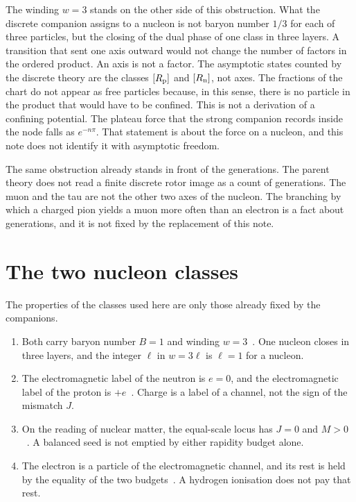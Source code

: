 \documentclass[a4paper]{article}
\begin{document}
The winding \(w=3\) stands on the other side of this obstruction. What the discrete companion assigns to a nucleon is not baryon number \(1/3\) for each of three particles, but the closing of the dual phase of one class in three layers. A transition that sent one axis outward would not change the number of factors in the ordered product. An axis is not a factor. The asymptotic states counted by the discrete theory are the classes \([R_{\rm p}]\) and \([R_{\rm n}]\), not axes. The fractions of the chart do not appear as free particles because, in this sense, there is no particle in the product that would have to be confined. This is not a derivation of a confining potential. The plateau force that the strong companion records inside the node falls as \(e^{-n\pi}\). That statement is about the force on a nucleon, and this note does not identify it with asymptotic freedom.

The same obstruction already stands in front of the generations. The parent theory does not read a finite discrete rotor image as a count of generations. The muon and the tau are not the other two axes of the nucleon. The branching by which a charged pion yields a muon more often than an electron is a fact about generations, and it is not fixed by the replacement of this note.

\section{The two nucleon classes}
\label{sec:classes}

The properties of the classes used here are only those already fixed by the companions.

\begin{enumerate}
\item Both carry baryon number \(B=1\) and winding \(w=3\)~\cite{dst-dio}. One nucleon closes in three layers, and the integer \(\ell\) in \(w=3\ell\) is \(\ell=1\) for a nucleon.
\item The electromagnetic label of the neutron is \(e=0\), and the electromagnetic label of the proton is \(+e\)~\cite{dst-strong}. Charge is a label of a channel, not the sign of the mismatch \(J\).
\item On the reading of nuclear matter, the equal-scale locus has \(J=0\) and \(M>0\)~\cite{dst-main}. A balanced seed is not emptied by either rapidity budget alone.
\item The electron is a particle of the electromagnetic channel, and its rest is held by the equality of the two budgets~\cite{dst-main}. A hydrogen ionisation does not pay that rest.
\end{enumerate}
\end{document}
